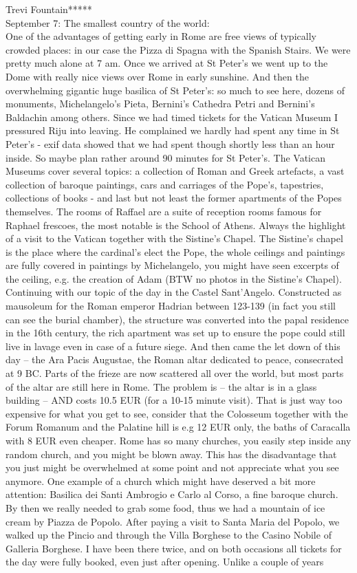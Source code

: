 Trevi Fountain*****\\

September 7: The smallest country of the world:\\
One of the advantages of getting early in Rome are free views of typically crowded places: in our case the Pizza di Spagna with the Spanish Stairs. We were pretty much alone at 7 am. Once we arrived at St Peter's we went up to the Dome with really nice views over Rome in early sunshine. And then the overwhelming gigantic huge basilica of St Peter's: so much to see here, dozens of monuments, Michelangelo's Pieta, Bernini's Cathedra Petri and Bernini's Baldachin among others. Since we had timed tickets for the Vatican Museum I pressured Riju into leaving. He complained we hardly had spent any time in St Peter's - exif data showed that we had spent though shortly less than an hour inside. So maybe plan rather around 90 minutes for St Peter's. The Vatican Museums cover several topics: a collection of Roman and Greek artefacts, a vast collection of baroque paintings, cars and carriages of the Pope's, tapestries, collections of books - and last but not least the former apartments of the Popes themselves. The rooms of Raffael are  a suite of reception rooms famous for Raphael frescoes, the most notable is the School of Athens. Always the highlight of a visit to the Vatican together with the Sistine's Chapel. The Sistine's chapel is the place where the cardinal's elect the Pope, the whole ceilings and paintings are fully covered in paintings by Michelangelo, you might have seen excerpts of the ceiling, e.g. the creation of Adam (BTW no photos in the Sistine's Chapel). Continuing with our topic of the day in the Castel Sant'Angelo. Constructed as mausoleum for the Roman emperor Hadrian between 123-139 (in fact you still can see the burial chamber), the structure was converted into the papal residence in the 16th century, the rich apartment was set up to ensure the pope could still live in lavage even in case of a future siege. And then came the let down of this day -- the Ara Pacis Augustae, the Roman altar dedicated to peace, consecrated at 9 BC. Parts of the frieze are now scattered all over the world, but most parts of the altar are still here in Rome. The problem is -- the altar is in a glass building -- AND costs 10.5 EUR (for a 10-15 minute visit). That is just way too expensive for what you get to see, consider that the Colosseum together with the Forum Romanum and the Palatine hill is e.g 12 EUR only, the baths of Caracalla with 8 EUR even cheaper. Rome has so many churches, you easily step inside any random church, and you might be blown away. This has the disadvantage that you just might be overwhelmed at some point and not appreciate what you see anymore. One example of a church which might have deserved a bit more attention: Basilica dei Santi Ambrogio e Carlo al Corso, a fine baroque church. By then we really needed to grab some food, thus we had a mountain of ice cream by Piazza de Popolo. After paying a visit to Santa Maria del Popolo, we walked up the Pincio and through the Villa Borghese to the Casino Nobile of Galleria Borghese. I have been there twice, and on both occasions all tickets for the day were fully booked, even just after opening. Unlike a couple of years 